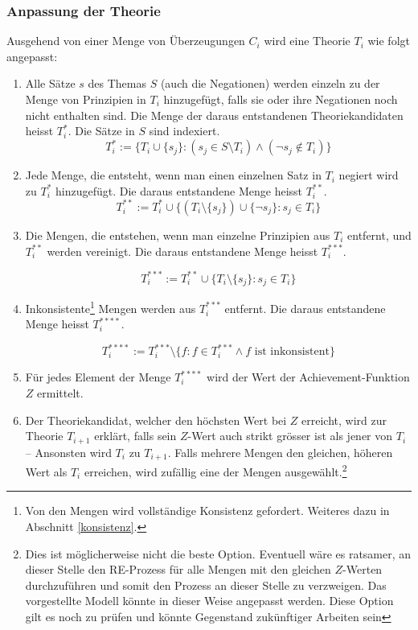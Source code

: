 \documentclass{article}
\begin{document}
\subsubsection{Anpassung der Theorie} \label{T-Anpassung}
Ausgehend von einer Menge von Überzeugungen $C_i$ wird eine Theorie $T_i$ wie folgt angepasst: 
\begin{enumerate}
    \item \label{1} Alle Sätze $s$ des Themas $S$ (auch die Negationen) werden einzeln zu der Menge von Prinzipien in $T_i$ hinzugefügt, falls sie oder ihre Negationen noch nicht enthalten sind. Die Menge der daraus entstandenen Theoriekandidaten heisst $T_i^*$. Die Sätze in $S$ sind indexiert.
    $$ 
        T_i^*:= \{ T_i \cup \{s_j\}: (s_j \in S \setminus T_i) \land (\neg s_j \not\in T_i) \}
    $$
    \item \label{1.1} Jede Menge, die entsteht, wenn man einen einzelnen Satz in $T_i$ negiert wird zu $T_i^*$ hinzugefügt. Die daraus entstandene Menge heisst $T_i^{**}$.
    $$
        T_i^{**}:= T_i^* \cup \{ (T_i \setminus \{s_j\}) \cup \{\neg s_j\}: s_j \in T_i\}
    $$
    \item \label{2} Die Mengen, die entstehen, wenn man einzelne Prinzipien aus $T_i$ entfernt, und $T_i^{**}$ werden vereinigt. Die daraus entstandene Menge heisst $T_i^{***}$.
    
    $$
        T_i^{***}:= T_i^{**} \cup \{ T_i \setminus \{s_j\}: s_j \in T_i\}
    $$
    
    \item \label{konsistenzfilter} Inkonsistente\footnote{Von den Mengen wird vollständige Konsistenz gefordert. Weiteres dazu in Abschnitt \ref{konsistenz}.} Mengen werden aus $T_i^{***}$ entfernt. Die daraus entstandene Menge heisst $T_i^{****}$.
    
    $$
        T_i^{****}:= T_i^{***} \setminus \{f : f \in T_i^{***} \land f \text{ ist inkonsistent} \}
    $$
    \item \label{3} Für jedes Element der Menge $T_i^{****}$ wird der Wert der Achievement-Funktion $Z$ ermittelt.
    \item \label{4} Der Theoriekandidat, welcher den höchsten Wert bei $Z$ erreicht, wird zur Theorie $T_{i+1}$ erklärt, falls sein $Z$-Wert auch strikt grösser ist als jener von $T_i$ -- Ansonsten wird $T_i$ zu $T_{i+1}$. Falls mehrere Mengen den gleichen, höheren Wert als $T_i$ erreichen, wird zufällig eine der Mengen ausgewählt.\footnote{Dies ist möglicherweise nicht die beste Option. Eventuell wäre es ratsamer, an dieser Stelle den RE-Prozess für alle Mengen mit den gleichen $Z$-Werten durchzuführen und somit den Prozess an dieser Stelle zu verzweigen. Das vorgestellte Modell könnte in dieser Weise angepasst werden. Diese Option gilt es noch zu prüfen und könnte Gegenstand zukünftiger Arbeiten sein}
\end{enumerate}
\end{document}
